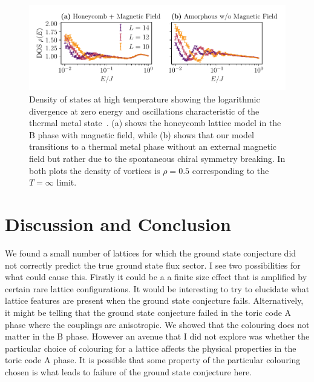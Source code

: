 \hypertarget{fig:DOS_oscillations}{%
\begin{figure}
\centering
\includegraphics[width=1\textwidth,height=\textheight]{figure_code/amk_chapter/results/DOS_oscillations/DOS_oscillations}
\caption[{Distinctive Oscillations in the Density of States}]{Density of states at high temperature showing the logarithmic divergence at zero energy and oscillations characteristic of the thermal metal state~\autocite{bocquet_disordered_2000,selfThermallyInducedMetallic2019}. (a) shows the honeycomb lattice model in the B phase with magnetic field, while (b) shows that our model transitions to a thermal metal phase without an external magnetic field but rather due to the spontaneous chiral symmetry breaking. In both plots the density of vortices is \(\rho = 0.5\) corresponding to the \(T = \infty\) limit.}
\label{fig:DOS_oscillations}
\end{figure}
}

\hypertarget{sec:AMK-Conclusion}{%
\section{Discussion and Conclusion}\label{sec:AMK-Conclusion}}

We found a small number of lattices for which the ground state conjecture did not correctly predict the true ground state flux sector. I see two possibilities for what could cause this. Firstly it could be a a finite size effect that is amplified by certain rare lattice configurations. It would be interesting to try to elucidate what lattice features are present when the ground state conjecture fails. Alternatively, it might be telling that the ground state conjecture failed in the toric code A phase where the couplings are anisotropic. We showed that the colouring does not matter in the B phase. However an avenue that I did not explore was whether the particular choice of colouring for a lattice affects the physical properties in the toric code A phase. It is possible that some property of the particular colouring chosen is what leads to failure of the ground state conjecture here.

